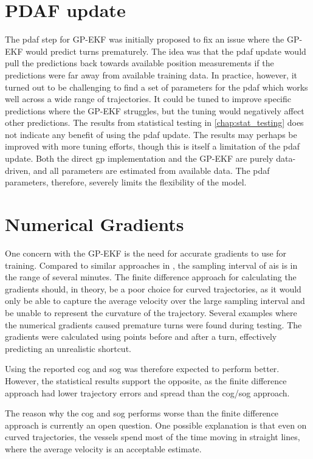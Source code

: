 \section{PDAF update}
The \acrshort{pdaf} step for GP-EKF was initially proposed to fix an issue where the GP-EKF would predict turns prematurely. The idea was that the \acrshort{pdaf} update would pull the predictions back towards available position measurements if the predictions were far away from available training data. In practice, however, it turned out to be challenging to find a set of parameters for the \acrshort{pdaf} which works well across a wide range of trajectories. It could be tuned to improve specific predictions where the GP-EKF struggles, but the tuning would negatively affect other predictions. The results from statistical testing in \cref{chap:stat_testing} does not indicate any benefit of using the \acrshort{pdaf} update. The results may perhaps be improved with more tuning efforts, though this is itself a limitation of the \acrshort{pdaf} update. Both the direct \acrshort{gp} implementation and the GP-EKF are purely data-driven, and all parameters are estimated from available data. The \acrshort{pdaf} parameters, therefore, severely limits the flexibility of the model. 

\section{Numerical Gradients}
One concern with the GP-EKF is the need for accurate gradients to use for training. Compared to similar approaches in \cite{vehicle_gp_prediction,pedestrian}, the sampling interval of \acrshort{ais} is in the range of several minutes. The finite difference approach for calculating the gradients should, in theory, be a poor choice for curved trajectories, as it would only be able to capture the average velocity over the large sampling interval and be unable to represent the curvature of the trajectory. Several examples where the numerical gradients caused premature turns were found during testing. The gradients were calculated using points before and after a turn, effectively predicting an unrealistic shortcut.  

Using the reported \acrshort{cog} and \acrshort{sog} was therefore expected to perform better. However, the statistical results support the opposite, as the finite difference approach had lower trajectory errors and spread than the \acrshort{cog}/\acrshort{sog} approach. 

The reason why the \acrshort{cog} and \acrshort{sog} performs worse than the finite difference approach is currently an open question. One possible explanation is that even on curved trajectories, the vessels spend most of the time moving in straight lines, where the average velocity is an acceptable estimate.

